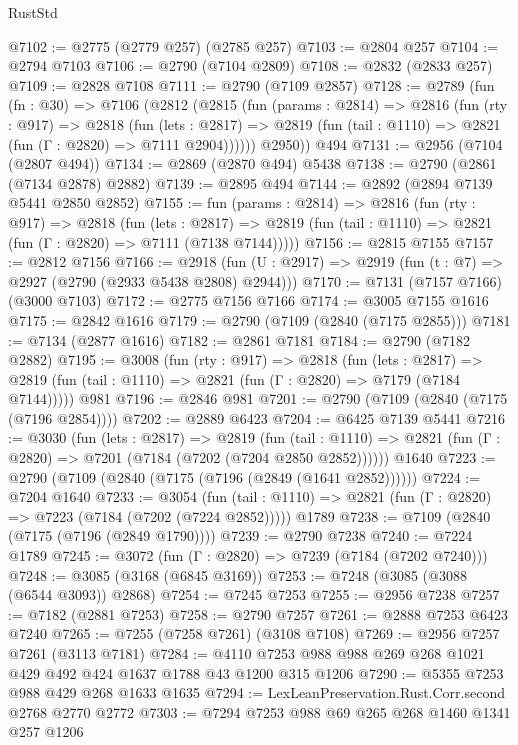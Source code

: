 \begin{lexlean}{RustStd}
\begin{coremodule}
@7102 := @2775 (@2779 @257) (@2785 @257)
@7103 := @2804 @257
@7104 := @2794 @7103
@7106 := @2790 (@7104 @2809)
@7108 := @2832 (@2833 @257)
@7109 := @2828 @7108
@7111 := @2790 (@7109 @2857)
@7128 := @2789
    (fun (fn : @30) =>
    @7106
      (@2812
        (@2815
          (fun (params : @2814) =>
          @2816
            (fun (rty : @917) =>
            @2818
              (fun (lets : @2817) =>
              @2819 (fun (tail : @1110) => @2821 (fun (Γ : @2820) => @7111 @2904))))))
        @2950))
    @494
@7131 := @2956 (@7104 (@2807 @494))
@7134 := @2869 (@2870 @494) @5438
@7138 := @2790 (@2861 (@7134 @2878) @2882)
@7139 := @2895 @494
@7144 := @2892 (@2894 @7139 @5441 @2850 @2852)
@7155 := fun (params : @2814) =>
  @2816
    (fun (rty : @917) =>
    @2818
      (fun (lets : @2817) =>
      @2819 (fun (tail : @1110) => @2821 (fun (Γ : @2820) => @7111 (@7138 @7144)))))
@7156 := @2815 @7155
@7157 := @2812 @7156
@7166 := @2918 (fun (U : @2917) => @2919 (fun (t : @7) => @2927 (@2790 (@2933 @5438 @2808) @2944)))
@7170 := @7131 (@7157 @7166) (@3000 @7103)
@7172 := @2775 @7156 @7166
@7174 := @3005 @7155 @1616
@7175 := @2842 @1616
@7179 := @2790 (@7109 (@2840 (@7175 @2855)))
@7181 := @7134 (@2877 @1616)
@7182 := @2861 @7181
@7184 := @2790 (@7182 @2882)
@7195 := @3008
    (fun (rty : @917) =>
    @2818
      (fun (lets : @2817) =>
      @2819 (fun (tail : @1110) => @2821 (fun (Γ : @2820) => @7179 (@7184 @7144)))))
    @981
@7196 := @2846 @981
@7201 := @2790 (@7109 (@2840 (@7175 (@7196 @2854))))
@7202 := @2889 @6423
@7204 := @6425 @7139 @5441
@7216 := @3030
    (fun (lets : @2817) =>
    @2819
      (fun (tail : @1110) => @2821 (fun (Γ : @2820) => @7201 (@7184 (@7202 (@7204 @2850 @2852))))))
    @1640
@7223 := @2790 (@7109 (@2840 (@7175 (@7196 (@2849 (@1641 @2852))))))
@7224 := @7204 @1640
@7233 := @3054
    (fun (tail : @1110) => @2821 (fun (Γ : @2820) => @7223 (@7184 (@7202 (@7224 @2852)))))
    @1789
@7238 := @7109 (@2840 (@7175 (@7196 (@2849 @1790))))
@7239 := @2790 @7238
@7240 := @7224 @1789
@7245 := @3072 (fun (Γ : @2820) => @7239 (@7184 (@7202 @7240)))
@7248 := @3085 (@3168 (@6845 @3169))
@7253 := @7248 (@3085 (@3088 (@6544 @3093)) @2868)
@7254 := @7245 @7253
@7255 := @2956 @7238
@7257 := @7182 (@2881 @7253)
@7258 := @2790 @7257
@7261 := @2888 @7253 @6423 @7240
@7265 := @7255 (@7258 @7261) (@3108 @7108)
@7269 := @2956 @7257 @7261 (@3113 @7181)
@7284 := @4110 @7253 @988 @988 @269 @268 @1021 @429 @492 @424 @1637 @1788 @43 @1200 @315 @1206
@7290 := @5355 @7253 @988 @429 @268 @1633 @1635
@7294 := LexLeanPreservation.Rust.Corr.second @2768 @2770 @2772
@7303 := @7294 @7253 @988 @69 @265 @268 @1460 @1341 @257 @1206

\end{coremodule}
\end{lexlean}
